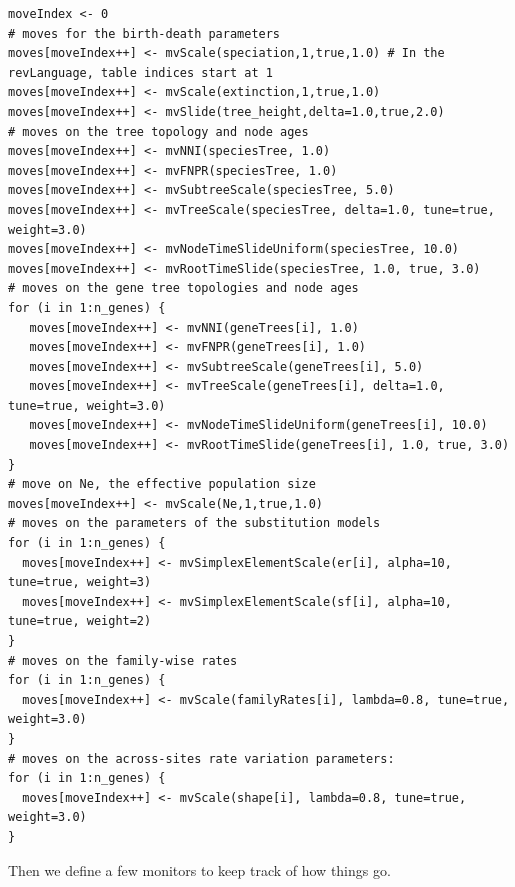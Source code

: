 \documentclass[11pt]{article}
\begin{document}
{\begin{framed}
{\tt \begin{snugshade*}
\begin{lstlisting}
moveIndex <- 0
# moves for the birth-death parameters
moves[moveIndex++] <- mvScale(speciation,1,true,1.0) # In the revLanguage, table indices start at 1
moves[moveIndex++] <- mvScale(extinction,1,true,1.0)
moves[moveIndex++] <- mvSlide(tree_height,delta=1.0,true,2.0)
# moves on the tree topology and node ages
moves[moveIndex++] <- mvNNI(speciesTree, 1.0)
moves[moveIndex++] <- mvFNPR(speciesTree, 1.0)
moves[moveIndex++] <- mvSubtreeScale(speciesTree, 5.0)
moves[moveIndex++] <- mvTreeScale(speciesTree, delta=1.0, tune=true, weight=3.0)
moves[moveIndex++] <- mvNodeTimeSlideUniform(speciesTree, 10.0)
moves[moveIndex++] <- mvRootTimeSlide(speciesTree, 1.0, true, 3.0)
# moves on the gene tree topologies and node ages
for (i in 1:n_genes) {
   moves[moveIndex++] <- mvNNI(geneTrees[i], 1.0)
   moves[moveIndex++] <- mvFNPR(geneTrees[i], 1.0)
   moves[moveIndex++] <- mvSubtreeScale(geneTrees[i], 5.0)
   moves[moveIndex++] <- mvTreeScale(geneTrees[i], delta=1.0, tune=true, weight=3.0)
   moves[moveIndex++] <- mvNodeTimeSlideUniform(geneTrees[i], 10.0)
   moves[moveIndex++] <- mvRootTimeSlide(geneTrees[i], 1.0, true, 3.0)
}
# move on Ne, the effective population size
moves[moveIndex++] <- mvScale(Ne,1,true,1.0)
# moves on the parameters of the substitution models
for (i in 1:n_genes) {
  moves[moveIndex++] <- mvSimplexElementScale(er[i], alpha=10, tune=true, weight=3) 
  moves[moveIndex++] <- mvSimplexElementScale(sf[i], alpha=10, tune=true, weight=2) 
}
# moves on the family-wise rates
for (i in 1:n_genes) {
  moves[moveIndex++] <- mvScale(familyRates[i], lambda=0.8, tune=true, weight=3.0)
}
# moves on the across-sites rate variation parameters:
for (i in 1:n_genes) {
  moves[moveIndex++] <- mvScale(shape[i], lambda=0.8, tune=true, weight=3.0)
}
\end{lstlisting}
\end{snugshade*}}

Then we define a few monitors to keep track of how things go.


\end{framed}}
\end{document}
